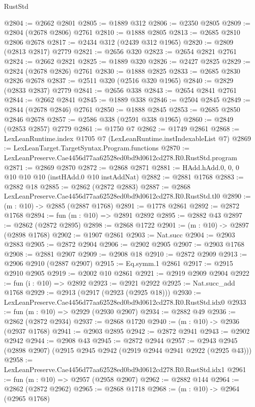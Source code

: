 \begin{lexlean}{RustStd}
\begin{coremodule}
@2804 := @2662 @2801
@2805 := @1889 @312
@2806 := @2350 @2805
@2809 := @2804 (@2678 @2806) @2761
@2810 := @1888 @2805
@2813 := @2685 @2810 @2806 @2678
@2817 := @2434 @312 (@2439 @312 @1965)
@2820 := @2809 (@2813 @2817) @2779
@2821 := @2656 @320
@2823 := @2654 @2821 @2761
@2824 := @2662 @2821
@2825 := @1889 @320
@2826 := @2427 @2825
@2829 := @2824 (@2678 @2826) @2761
@2830 := @1888 @2825
@2833 := @2685 @2830 @2826 @2678
@2837 := @2511 @320 (@2516 @320 @1965)
@2840 := @2829 (@2833 @2837) @2779
@2841 := @2656 @338
@2843 := @2654 @2841 @2761
@2844 := @2662 @2841
@2845 := @1889 @338
@2846 := @2504 @2845
@2849 := @2844 (@2678 @2846) @2761
@2850 := @1888 @2845
@2853 := @2685 @2850 @2846 @2678
@2857 := @2586 @338 (@2591 @338 @1965)
@2860 := @2849 (@2853 @2857) @2779
@2861 := @1750 @7
@2862 := @1749 @2861
@2868 := LexLeanRuntime.index @1705 @7 (LexLeanRuntime.instIndexableList @7)
@2869 := LexLeanTarget.TargetSyntax.Program.functions
@2870 := LexLeanPreserve.Cae4456d77aa62528ed0bd9d0612cd278.R0.RustStd.program
@2871 := @2869 @2870
@2872 := @2868 @2871
@2881 := HAdd.hAdd.{0, 0, 0} @10 @10 @10 (instHAdd.{0} @10 instAddNat)
@2882 := @2881 @1768
@2883 := @2882 @18
@2885 := @2862 (@2872 @2883)
@2887 := @2868 LexLeanPreserve.Cae4456d77aa62528ed0bd9d0612cd278.R0.RustStd.tl0
@2890 := (m : @10) -> @2885 (@2887 @1768)
@2891 := @1778 @2861
@2892 := @2872 @1768
@2894 := fun (m : @10) => @2891 @2892
@2895 := @2882 @43
@2897 := @2862 (@2872 @2895)
@2898 := @2868 @1722
@2901 := (m : @10) -> @2897 (@2898 @1768)
@2902 := @1907 @2861
@2903 := Nat.succ
@2904 := @2903 @2883
@2905 := @2872 @2904
@2906 := @2902 @2905
@2907 := @2903 @1768
@2908 := @2881 @2907
@2909 := @2908 @18
@2910 := @2872 @2909
@2913 := @2906 @2910 (@2887 @2907)
@2915 := Eq.symm.{1} @2861
@2917 := @2915 @2910 @2905
@2919 := @2002 @10 @2861
@2921 := @2919 @2909 @2904
@2922 := fun (i : @10) => @2892
@2923 := @2921 @2922
@2925 := Nat.succ_add @1768
@2929 := @2913 (@2917 (@2923 (@2925 @18)))
@2930 := LexLeanPreserve.Cae4456d77aa62528ed0bd9d0612cd278.R0.RustStd.idx0
@2933 := fun (m : @10) => @2929 (@2930 @2907)
@2934 := @2882 @49
@2936 := @2862 (@2872 @2934)
@2937 := @2868 @1720
@2940 := (m : @10) -> @2936 (@2937 @1768)
@2941 := @2903 @2895
@2942 := @2872 @2941
@2943 := @2902 @2942
@2944 := @2908 @43
@2945 := @2872 @2944
@2957 := @2943 @2945 (@2898 @2907) (@2915 @2945 @2942 (@2919 @2944 @2941 @2922 (@2925 @43)))
@2958 := LexLeanPreserve.Cae4456d77aa62528ed0bd9d0612cd278.R0.RustStd.idx1
@2961 := fun (m : @10) => @2957 (@2958 @2907)
@2962 := @2882 @144
@2964 := @2862 (@2872 @2962)
@2965 := @2868 @1718
@2968 := (m : @10) -> @2964 (@2965 @1768)

\end{coremodule}
\end{lexlean}
